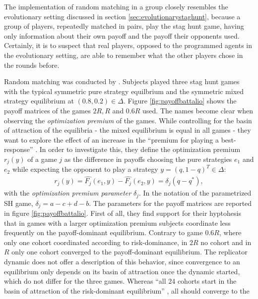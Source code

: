 \documentclass[11pt]{article}
\begin{document}
The implementation of random matching in a group closely resembles the 
evolutionary setting discussed in section \ref{sec:evolutionarystaghunt}, 
because a group of players, repeatedly matched in pairs, play the stag hunt 
game, having only information about their own payoff and the payoff their
opponents used. Certainly, it is to suspect that real players, opposed
to the programmed agents in the evolutionary setting, are able to remember
what the other players chose in the rounds before. 

Random matching was conducted by \textcite{battalio_optimization_2001}. 
Subjects played three stag hunt games with the typical symmetric pure strategy
equilbrium and the symmetric mixed strategy equilibrium at $(0.8,0.2) \in
\Delta$. Figure \ref{fig:payoffbattalio} shows the payoff matrices of the
games $2R, R$ and $0.6R$ used. The names become clear when observing the 
\textit{optimization premium} of the games. While controlling for the basin of 
attraction of the equilibria - the mixed equilibrium is equal in all games -
they want to explore the effect of an increase in the ``premium for playing
a best-response'' \parencite[751]{battalio_optimization_2001}. 
In order to investigate this, they define the optimization premium $r_j(y)$ of 
a game $j$ as the difference in payoffs choosing the pure strategies 
$e_1$ and $e_2$ while expecting the opponent to play a strategy 
$y=(q,1-q)^T \in \Delta$:
\begin{align}
        r_j(y)= \hat{F_j}(e_1,y) - \hat{F_j}(e_2,y) = \delta_j(q-q^*),
\end{align}
with the \textit{optimization premium parameter} $\delta_j$. In the notation
 of the parametrized SH game, $\delta_j = a - c + d - b$.
The parameters for the payoff matrices are reported in figure 
\ref{fig:payoffbattalio}. 
First of all, they find support for their hyptohesis that in games with a 
larger optimization premium subjects coordinate less frequently on the 
payoff-dominant equilibrium. 
Contrary to game $0.6R$, where only one cohort coordinated according 
to risk-dominance, in $2R$ no cohort and in $R$ only one cohort 
converged to the payoff-dominant equilibrium. The replicator dynamic does 
not offer a description of this behavior, since convergence to an 
equilibrium only depends on its basin of attraction once the dynamic 
started, which do not differ for the three games. 
Whereas ``all 24 cohorts start in the basin of attraction
of the risk-dominant equilibrium'' 
\parencite[755]{battalio_optimization_2001}, all should converge to the 
\end{document}
